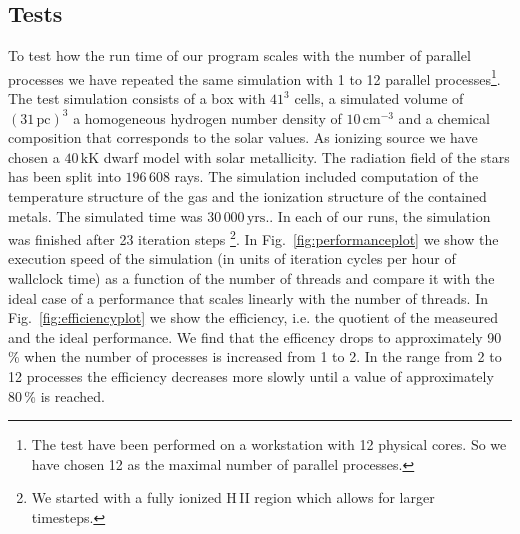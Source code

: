 \documentclass[a4paper,10pt]{article}
\begin{document}
\begin{appendix}
  
\subsection{Tests}
To test how the run time of our program scales with the number of parallel 
processes we have repeated the same simulation with 1 to 12 parallel 
processes\footnote{The test have been performed on a workstation with 12 
physical cores. So we have chosen 12 as the maximal number of parallel 
processes.}. The test simulation consists of a box with $41^3$ cells, a 
simulated volume of $(31\,\mathrm{pc})^3$ a homogeneous hydrogen number density 
of $10\,\mathrm{cm^{-3}}$ and a chemical composition that corresponds to the 
solar values. As ionizing source we have chosen a $40\,\mathrm{kK}$ dwarf 
model with solar metallicity. The radiation field of 
the stars has been split into $196\,608$ rays.  The simulation included 
computation of the temperature structure of the gas and the ionization structure 
of the contained metals. The simulated time was $30\,000\,\mathrm{yrs.}$. In 
each of our runs, the simulation was finished after 23 iteration steps 
\footnote{We started with a fully ionized H\,II region which allows for larger 
timesteps.}. In Fig.~\ref{fig:performanceplot} we show the execution speed of 
the simulation (in units of iteration cycles per hour of wallclock time) as a 
function of the number of threads and compare it with the ideal case of a 
performance that scales linearly with the number of threads. In 
Fig.~\ref{fig:efficiencyplot} we show the efficiency, i.e. the quotient of the 
measeured and the ideal performance. We find that the efficency drops to 
approximately 90\,\% when the number of processes is increased from 1 to 2. In 
the range from 2 to 12 processes the efficiency decreases more slowly until a 
value of approximately
80\,\% is reached. 


\end{appendix}
\end{document}
